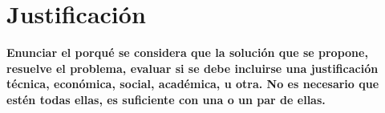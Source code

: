 \section{Justificación}\label{sc:Just}

\textbf{Enunciar el porqué se considera que la solución que se propone, resuelve el problema, evaluar si se debe incluirse una justificación técnica, económica, social, académica, u otra. No es necesario que estén todas ellas, es suficiente con una o un par de ellas.}